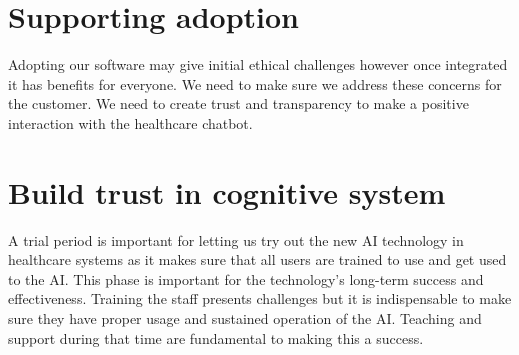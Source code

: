 \documentclass{article}
\begin{document}
\section{Supporting adoption}
Adopting our software may give initial ethical  challenges however once integrated it has benefits for everyone. We need to make sure we address these concerns for the customer. We need to create trust and transparency to make a positive interaction with the healthcare chatbot.


\section{Build trust in cognitive system}
A trial period is important for letting us try out the new AI technology in healthcare systems as it makes sure that all users are trained to use and get used to the AI. This  phase is important for the technology's long-term success and effectiveness. Training the staff presents challenges but it is indispensable to make sure they have proper usage and sustained operation of the AI. Teaching and support during that time are fundamental to making this a success.
\end{document}
